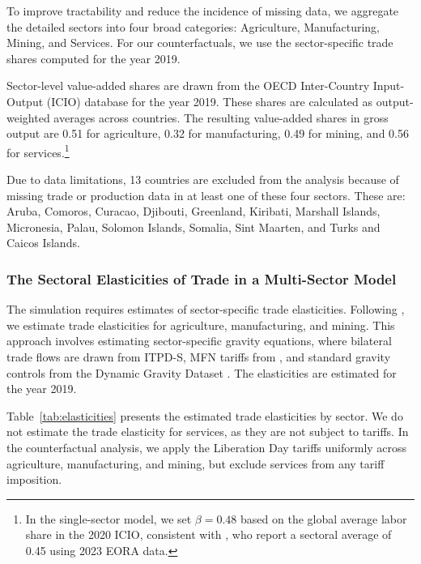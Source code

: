 \documentclass[12pt]{article}
\begin{document}
To improve tractability and reduce the incidence of missing data, we aggregate the detailed sectors into four broad categories: Agriculture, Manufacturing, Mining, and Services. For our counterfactuals, we use the sector-specific trade shares computed for the year 2019.


Sector-level value-added shares are drawn from the OECD Inter-Country Input-Output (ICIO) database for the year 2019. These shares are calculated as output-weighted averages across countries. The resulting value-added shares in gross output are 0.51 for agriculture, 0.32 for manufacturing, 0.49 for mining, and 0.56 for services.\footnote{In the single-sector model, we set $\beta = 0.48$ based on the global average labor share in the 2020 ICIO, consistent with \cite{CALIENDO_JIE_tariff}, who report a sectoral average of 0.45 using 2023 EORA data.%
}

Due to data limitations, 13 countries are excluded from the analysis because of missing trade or production data in at least one of these four sectors. These are: Aruba, Comoros, Curacao, Djibouti, Greenland, Kiribati, Marshall Islands, Micronesia, Palau, Solomon Islands, Somalia, Sint Maarten, and Turks and Caicos Islands.

\subsubsection{The Sectoral Elasticities of Trade in a Multi-Sector Model}
The simulation requires estimates of sector-specific trade elasticities. Following \citet{fontagne2022tariff}, we estimate trade elasticities for agriculture, manufacturing, and mining. This approach involves estimating sector-specific gravity equations, where bilateral trade flows are drawn from ITPD-S, MFN tariffs from \citet{teti2024missing}, and standard gravity controls from the Dynamic Gravity Dataset \citep{gurevich2018dynamic}. The elasticities are estimated for the year 2019.


Table~\ref{tab:elasticities} presents the estimated trade elasticities by sector. We do not estimate the trade elasticity for services, as they are not subject to tariffs. In the counterfactual analysis, we apply the Liberation Day tariffs uniformly across agriculture, manufacturing, and mining, but exclude services from any tariff imposition.
\end{document}
